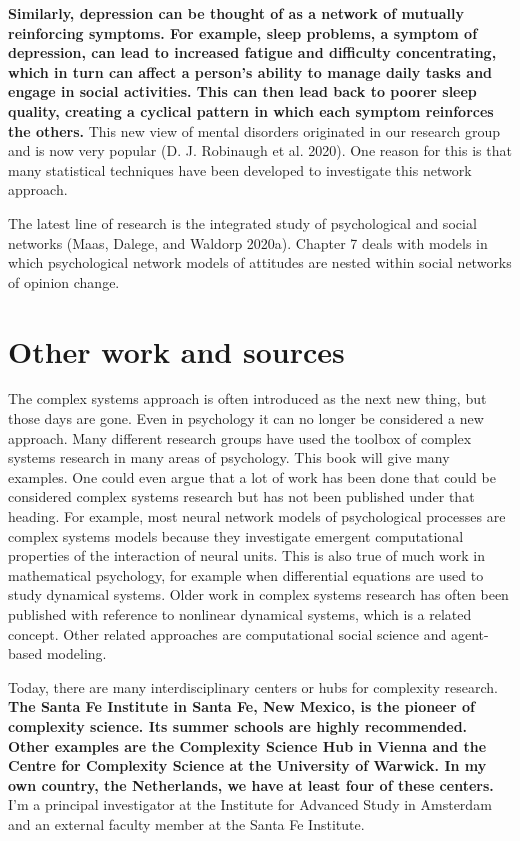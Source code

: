 \documentclass[
  letterpaper,
]{scrbook}
\begin{document}
\textbf{Similarly, depression can be thought of as a network of mutually
reinforcing symptoms. For example, sleep problems, a symptom of
depression, can lead to increased fatigue and difficulty concentrating,
which in turn can affect a person's ability to manage daily tasks and
engage in social activities. This can then lead back to poorer sleep
quality, creating a cyclical pattern in which each symptom reinforces
the others.} This new view of mental disorders originated in our
research group and is now very popular (D. J. Robinaugh et al. 2020).
One reason for this is that many statistical techniques have been
developed to investigate this network approach.

The latest line of research is the integrated study of psychological and
social networks (Maas, Dalege, and Waldorp 2020a). Chapter 7 deals with
models in which psychological network models of attitudes are nested
within social networks of opinion change.

\hypertarget{other-work-and-sources}{%
\section{Other work and sources}\label{other-work-and-sources}}

The complex systems approach is often introduced as the next new thing,
but those days are gone. Even in psychology it can no longer be
considered a new approach. Many different research groups have used the
toolbox of complex systems research in many areas of psychology. This
book will give many examples. One could even argue that a lot of work
has been done that could be considered complex systems research but has
not been published under that heading. For example, most neural network
models of psychological processes are complex systems models because
they investigate emergent computational properties of the interaction of
neural units. This is also true of much work in mathematical psychology,
for example when differential equations are used to study dynamical
systems. Older work in complex systems research has often been published
with reference to nonlinear dynamical systems, which is a related
concept. Other related approaches are computational social science and
agent-based modeling.

Today, there are many interdisciplinary centers or hubs for complexity
research. \textbf{The Santa Fe Institute in Santa Fe, New Mexico, is the
pioneer of complexity science. Its summer schools are highly
recommended. Other examples are the Complexity Science Hub in Vienna and
the Centre for Complexity Science at the University of Warwick. In my
own country, the Netherlands, we have at least four of these centers.}
I'm a principal investigator at the Institute for Advanced Study in
Amsterdam and an external faculty member at the Santa Fe Institute.
\end{document}
